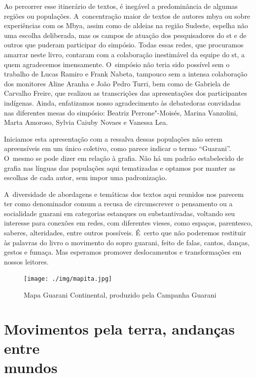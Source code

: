 Ao percorrer esse itinerário de textos, é inegável a predominância de
algumas regiões ou populações. A~concentração maior de textos de
autores mbya ou sobre experiências com os Mbya, assim como de aldeias
na região Sudeste, espelha não uma escolha deliberada, mas os campos de
atuação dos pesquisadores do st e de outros que puderam participar
do simpósio. Todas essas redes, que procuramos amarrar neste livro,
contaram com a colaboração inestimável da equipe do st, a quem
agradecemos imensamente. O~simpósio não teria sido possível sem o
trabalho de Lucas Ramiro e Frank Nabeta, tampouco sem a intensa
colaboração dos monitores Aline Aranha e João Pedro Turri, bem como de
Gabriela de Carvalho Freire, que realizou as transcrições das
apresentações dos participantes indígenas. Ainda, enfatizamos nosso
agradecimento às debatedoras convidadas nas diferentes mesas do
simpósio: Beatriz Perrone"-Moisés, Marina Vanzolini, Marta Amoroso,
Sylvia Caiuby Novaes e Vanessa Lea.

Iniciamos esta apresentação com a ressalva dessas populações não serem
apreensíveis em um único coletivo, como parece indicar o termo ``Guarani''.
O~mesmo se pode dizer em relação à grafia. Não há um padrão
estabelecido de grafia nas línguas das populações aqui tematizadas e
optamos por manter as escolhas de cada autor, sem impor uma
padronização. 

A~diversidade de abordagens e temáticas dos textos aqui reunidos nos
parecem ter como denominador comum a recusa de circunscrever o
pensamento ou a socialidade guarani em categorias estanques ou
substantivadas, voltando seu interesse para conexões em redes, com
diferentes vieses, como espaços, parentesco, saberes, alteridades,
entre outros possíveis. É~certo que não poderemos restituir às palavras
do livro o movimento do sopro guarani, feito de falas, cantos, danças,
gestos e fumaça. Mas esperamos promover deslocamentos e transformações
em nossos leitores. 

\begin{vplace}
\begin{figure}[H]
  \centering
  \texttt{[image: ./img/mapita.jpg]}	
  \hfill
  \caption{Mapa Guarani Continental, produzido pela Campanha Guarani}
\end{figure}
\end{vplace}

\makeatletter\@openrightfalse
\movetooddpage
\part{Movimentos pela terra, andanças entre \\mundos}

